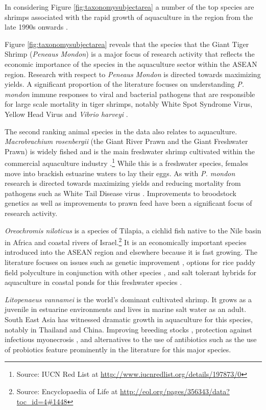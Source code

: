 \documentclass[openany]{book}
\let\rmarkdownfootnote\footnote%
\def\footnote{\protect\rmarkdownfootnote}
\theoremstyle{definition}
\theoremstyle{definition}
\theoremstyle{definition}
\theoremstyle{remark}
\begin{document}
In considering Figure \ref{fig:taxonomysubjectarea} a number of the top
species are shrimps associated with the rapid growth of aquaculture in
the region from the late 1990s onwards \citep{Hishamunda_2009}.

Figure \ref{fig:taxonomysubjectarea} reveals that the species that the
Giant Tiger Shrimp (\emph{Peneaus Mondon}) is a major focus of research
activity that reflects the economic importance of the species in the
aquaculture sector within the ASEAN region. Research with respect to
\emph{Peneaus Mondon} is directed towards maximizing yields. A
significant proportion of the literature focuses on understanding
\emph{P. mondon} immune responses to viral and bacterial pathogens that
are responsible for large scale mortality in tiger shrimps, notably
White Spot Syndrome Virus, Yellow Head Virus and \emph{Vibrio harveyi}
\citep{Wongteerasupaya_1995, Ponprateep_2011, Jaree_2012}.

The second ranking animal species in the data also relates to
aquaculture. \emph{Macrobrachium rosenbergii} (the Giant River Prawn and
the Giant Freshwater Prawn) is widely fished and is the main freshwater
shrimp cultivated within the commercial aquaculture industry
\citep{Macrobrachium_2012}.\footnote{Source: IUCN Red List at
  \url{http://www.iucnredlist.org/details/197873/0}} While this is a
freshwater species, females move into brackish estuarine waters to lay
their eggs. As with \emph{P. mondon} research is directed towards
maximizing yields and reducing mortality from pathogens such as White
Tail Disease virus \citep{Bonami_2011}. Improvements to broodstock
genetics \citep{Karaket_2012, Nguyen_Thanh_2015, Thanh_2010} as well as
improvements to prawn feed \citep{Kangpanich_2016} have been a
significant focus of research activity.

\emph{Oreochromis niloticus} is a species of Tilapia, a cichlid fish
native to the Nile basin in Africa and coastal rivers of
Israel.\footnote{Source: Encyclopaedia of Life at
  \url{http://eol.org/pages/356343/data?toc_id=4\#1448}} It is an
economically important species introduced into the ASEAN region and
elsewhere because it is fast growing. The literature focuses on issues
such as genetic improvement \citep{Bentsen_1998}, options for rice paddy
field polyculture in conjunction with other species \citep{Vromant_2002}
, and salt tolerant hybrids for aquaculture in coastal ponds for this
freshwater species \citep{Kamal_2005}.

\emph{Litopenaeus vannamei} is the world's dominant cultivated shrimp.
It grows as a juvenile in estuarine environments and lives in marine
salt water as an adult. South East Asia has witnessed dramatic growth in
aquaculture for this species, notably in Thailand and China. Improving
breeding stocks \citep{Nimrat_2006}, protection against infectious
myonecrosis \citep{Silva_2010}, and alternatives to the use of
antibiotics such as the use of probiotics \citep{Nimrat_2011} feature
prominently in the literature for this major species.
\end{document}
